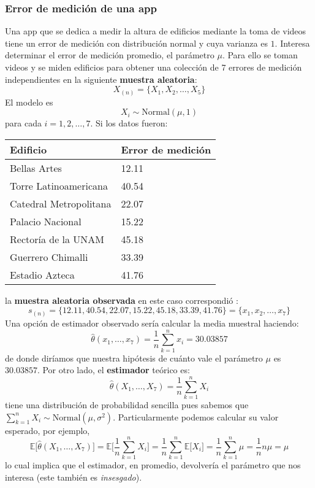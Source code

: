 \documentclass[
]{book}
\newenvironment{Ejemplo}
{\begin{mdframed}[
  linecolor=ejemplocolor,
  skipabove=12pt,
  skipbelow=12pt,
  roundcorner=20pt,
  splittopskip=2\topsep]}
{\end{mdframed}}
\begin{document}
\begin{Ejemplo}
\hypertarget{error-de-mediciuxf3n-de-una-app}{%
\subsubsection{Error de medición de una
app}\label{error-de-mediciuxf3n-de-una-app}}

Una app que se dedica a medir la altura de edificios mediante la toma de
videos tiene un error de medición con distribución normal y cuya
varianza es \(1\). Interesa determinar el error de medición promedio, el
parámetro \(\mu\). Para ello se toman videos y se miden edificios para
obtener una colección de 7 errores de medición independientes en la
siguiente \textbf{muestra aleatoria}: \[
X_{(n)} = \{X_1, X_2, \dots, X_{5} \}
\] El modelo es \[
X_i \sim \text{Normal}(\mu, 1)
\] para cada \(i = 1, 2, \dots, 7\). Si los datos fueron:

\begin{longtable}[]{@{}ll@{}}
\toprule
\textbf{Edificio} & \textbf{Error de medición}\tabularnewline
\midrule
\endhead
Bellas Artes & 12.11\tabularnewline
Torre Latinoamericana & 40.54\tabularnewline
Catedral Metropolitana & 22.07\tabularnewline
Palacio Nacional & 15.22\tabularnewline
Rectoría de la UNAM & 45.18\tabularnewline
Guerrero Chimalli & 33.39\tabularnewline
Estadio Azteca & 41.76\tabularnewline
\bottomrule
\end{longtable}

la \textbf{muestra aleatoria observada} en este caso correspondió : \[
s_{(n)} = \{12.11,40.54,22.07,15.22,45.18, 33.39, 41.76\} = \{x_1, x_2, \dots, x_7\}
\] Una opción de estimador observado sería calcular la media muestral
haciendo: \[
\hat{\theta}(x_1, \dots, x_7) = \frac{1}{n} \sum_{k = 1}^n x_i = 30.03857
\] de donde diríamos que nuestra hipótesis de cuánto vale el parámetro
\(\mu\) es \(30.03857\). Por otro lado, el \textbf{estimador} teórico
es: \[
\hat{\theta}(X_1, \dots, X_7) = \frac{1}{n} \sum_{k = 1}^n X_i 
\] tiene una distribución de probabilidad sencilla pues sabemos que
\(\sum_{k = 1}^n X_i \sim \textrm{Normal}(\mu,\sigma^2)\).
Particularmente podemos calcular su valor esperado, por ejemplo, \[
\mathbb{E}\Big[  \hat{\theta}(X_1, \dots, X_7) \Big]  =  \mathbb{E}\Big[  \frac{1}{n} \sum_{k = 1}^n X_i  \Big] = \frac{1}{n}\sum_{k = 1}^n \mathbb{E}\Big[X_i \Big] = \frac{1}{n}\sum_{k = 1}^n  \mu = \frac{1}{n} n\mu = \mu
\] lo cual implica que el estimador, en promedio, devolvería el
parámetro que nos interesa (este también es \emph{insesgado}).
\end{Ejemplo}

  
\end{document}
